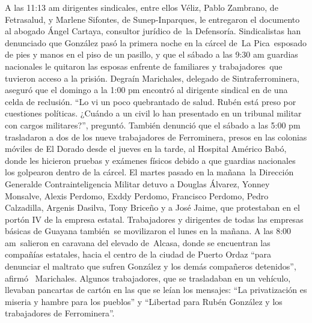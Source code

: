 \documentclass{article}%
\begin{document}
\newline%
%
A las 11:13 am dirigentes sindicales, entre ellos Véliz, Pablo Zambrano, de Fetrasalud, y Marlene Sifontes, de Sunep{-}Inparques, le entregaron el documento al abogado Ángel Cartaya, consultor jurídico de~la Defensoría.%
\newline%
%
Sindicalistas han denunciado que González pasó la primera noche en la cárcel de~La Pica~esposado de pies y manos en el piso de un pasillo, y que el sábado a las 9:30 am guardias nacionales le quitaron las esposas enfrente de familiares y trabajadores~que tuvieron acceso a la prisión.%
\newline%
%
Degraín Marichales, delegado de Sintraferrominera, aseguró que el domingo a la 1:00 pm encontró al dirigente sindical en de una celda de reclusión. “Lo vi un poco quebrantado de salud. Rubén está preso por cuestiones políticas. ¿Cuándo a un civil lo han presentado en un tribunal militar con cargos militares?”, preguntó.%
\newline%
%
También denunció que el sábado a las 5:00 pm trasladaron a dos de los nueve trabajadores de Ferrominera, presos en las colonias móviles de El Dorado desde el jueves en la tarde, al Hospital Américo Babó, donde les hicieron pruebas y exámenes físicos debido a que guardias nacionales los golpearon dentro de la cárcel. El martes pasado en la mañana~la Dirección Generalde Contrainteligencia Militar detuvo a Douglas Álvarez, Yonney Monsalve, Alexis Perdomo, Exddy Perdomo, Francisco Perdomo, Pedro Calzadilla, Argenis Dasilva, Tony Briceño y a José Jaime, que protestaban en el portón IV de la empresa estatal.%
\newline%
%
Trabajadores y dirigentes de todas las empresas básicas de Guayana también~se movilizaron el lunes en la mañana. A las 8:00 am~salieron en caravana del elevado de~Alcasa, donde se encuentran las compañías estatales, hacia el centro de la ciudad de Puerto Ordaz “para denunciar el maltrato que sufren González y los demás compañeros detenidos”, afirmó~ Marichales.%
\newline%
%
Algunos trabajadores, que se trasladaban en un vehículo, llevaban pancartas de cartón en las que se leían los mensajes: “La privatización es miseria y hambre para los pueblos” y “Libertad para Rubén González y los trabajadores de Ferrominera”.%
\newline%
%
\end{document}
